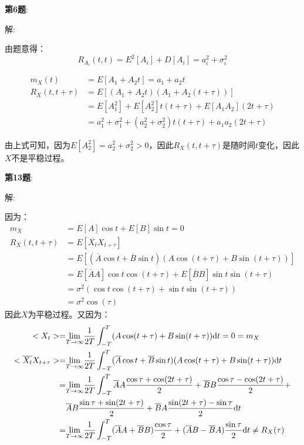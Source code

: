 \documentclass{article}
\begin{document}
\noindent
\textbf{第6题}:

\noindent
解:

由题意得：
\begin{equation}
    R_{A_{i}}(t,t)=E^{2}[A_{i}]+D[A_{i}]=a_{i}^{2}+\sigma_{i}^{2}
\end{equation}

\begin{equation}
    \begin{aligned}
        m_{X}(t)&=E[A_{1}+A_{2}t]=a_{1}+a_{2}t\\
        R_{X}(t,t+\tau)&=E[(A_{1}+A_{2}t)(A_{1}+A_{2}(t+\tau))]\\
        &=E[A_{1}^{2}]+E[A_{2}^{2}]t(t+\tau)+E[A_{1}A_{2}](2t+\tau)\\
        &=a_{1}^{2}+\sigma_{1}^{2}+(a_{2}^{2}+\sigma_{2}^{2})t(t+\tau)+a_{1}a_{2}(2t+\tau)
    \end{aligned}
\end{equation}

由上式可知，因为$E[A_{2}^{2}]=a_{2}^{2}+\sigma_{2}^{2}>0$，因此$R_{X}(t,t+\tau)$是随时间$t$变化，因此
$X$不是平稳过程。

\noindent
\textbf{第13题}:

\noindent
解:

因为：
\begin{equation}
    \begin{aligned}
        m_{X}&=E[A]\cos t+E[B]\sin t=0\\
        R_{X}(t,t+\tau)&=E[\overline{X_{t}}X_{t+\tau}]\\
        &=E[(\overline{A}\cos t+\overline{B}\sin t)(A\cos (t+\tau)+B\sin(t+\tau))]\\
        &=E[\overline{A}A]\cos t\cos(t+\tau)+E[\overline{B}B]\sin t\sin(t+\tau)\\
        &=\sigma^{2}(\cos t\cos(t+\tau)+\sin t\sin(t+\tau))\\
        &=\sigma^{2}\cos(\tau)
    \end{aligned}
\end{equation}
因此$X$为平稳过程。又因为：
\begin{equation}
    \begin{aligned}
        <X_{t}>=&\underset{T\rightarrow\infty}{{\rm lim}}\frac{1}{2T}\int_{-T}^{T}(A\cos (t+\tau)+B\sin(t+\tau)){\rm d}t=0=m_{X}\\
        <\overline{X_{t}}X_{t+\tau}>=&\underset{T\rightarrow\infty}{{\rm lim}}\frac{1}{2T}\int_{-T}^{T}(\overline{A}\cos {t}+\overline{B}\sin{t})
        (A\cos (t+\tau)+B\sin(t+\tau)){\rm d}t\\
        =&\underset{T\rightarrow\infty}{{\rm lim}}\frac{1}{2T}\int_{-T}^{T}\overline{A}A\frac{\cos\tau+\cos(2t+\tau)}{2}+\overline{B}B\frac{\cos\tau-\cos(2t+\tau)}{2}+\\
        &\overline{A}B\frac{\sin\tau+\sin(2t+\tau)}{2}+\overline{B}A\frac{\sin(2t+\tau)-\sin\tau}{2}{\rm d}t\\
        =&\underset{T\rightarrow\infty}{{\rm lim}}\frac{1}{2T}\int_{-T}^{T}(\overline{A}A+\overline{B}B)\frac{\cos\tau}{2}+(\overline{A}B-\overline{B}A)\frac{\sin\tau}{2}{\rm d}t\neq R_{X}(\tau)
    \end{aligned}
\end{equation}
\end{document}
